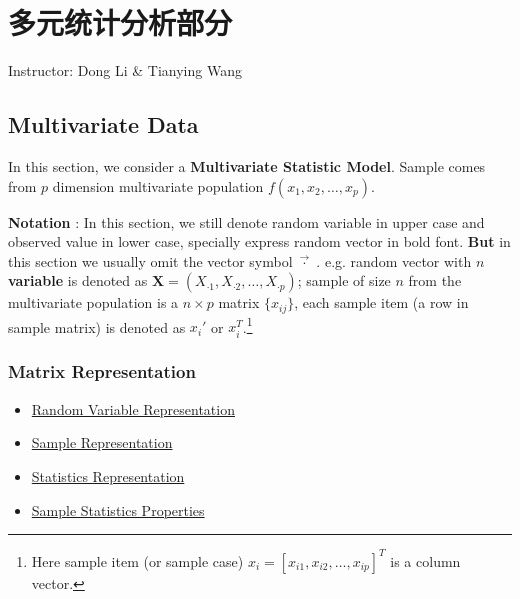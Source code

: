 \section{多元统计分析部分}\label{SecMultivariateStatisticalAnalysis}
\begin{center}
    Instructor: Dong Li \& Tianying Wang
\end{center}
\subsection{Multivariate Data}
    In this section, we consider a \textbf{Multivariate Statistic Model}. Sample comes from $p$ dimension multivariate population $f(x_1,x_2,\ldots,x_p)$.

    \textbf{Notation }: In this section, we still denote random variable in upper case and observed value in lower case, specially express random vector in bold font. \textbf{But} in this section we usually omit the vector symbol $ \vec{\cdot} \,\,$. e.g.
    random vector with $ n $ \textbf{variable }is denoted as $\mathbf{X}=(X_{\cdot 1},X_{\cdot 2},\ldots ,X_{\cdot p})$; sample of size $ n $ from the multivariate population is a $ n\times p $ matrix $ \{x_{ij}\} $, each sample item (a row in sample matrix) is denoted as $ x_i' $ or $ x_i^T $.\footnote{Here sample item (or sample case) $x_i=[x_{i1},x_{i2},\ldots,x_{ip}]^T$ is a column vector.} 


\subsubsection{Matrix Representation}


    \begin{itemize}[topsep=0pt,itemsep=1pt]
        \item \hyperlink{RandomVariableRepresentation}{Random Variable Representation}
        \item \hyperlink{SampleRepresentation}{Sample Representation}
        \item \hyperlink{StatisticsRepresentation}{Statistics Representation}
        \item \hyperlink{SampleStatisticsProperties}{Sample Statistics Properties}
    \end{itemize}
    



